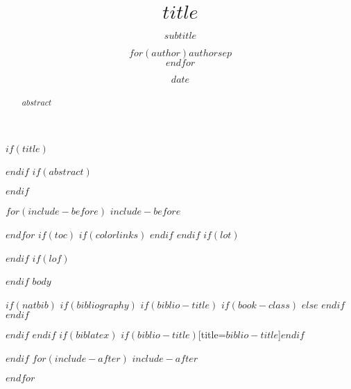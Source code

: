 \documentclass[$if(fontsize)$$fontsize$,$endif$$if(lang)$$babel-lang$,$endif$$if(papersize)$$papersize$paper,$endif$$for(classoption)$$classoption$$sep$,$endfor$]{$documentclass$}
\title{$title$}
\title{}
\subtitle{$subtitle$}
\author{$for(author)$$author$$sep$ \\ $endfor$}
\author{}
\date{$date$}
\date{}
\begin{document}


$if(title)$
\maketitle
$endif$
$if(abstract)$
\begin{abstract}
$abstract$
\end{abstract}
$endif$

$for(include-before)$
$include-before$

$endfor$
$if(toc)$
{
$if(colorlinks)$
\hypersetup{linkcolor=$if(toccolor)$$toccolor$$else$black$endif$}
$endif$
\setcounter{tocdepth}{$toc-depth$}
\tableofcontents
}
$endif$
$if(lot)$
\listoftables
$endif$
$if(lof)$
\listoffigures
$endif$
$body$

$if(natbib)$
$if(bibliography)$
$if(biblio-title)$
$if(book-class)$
\renewcommand\bibname{$biblio-title$}
$else$
\renewcommand\refname{$biblio-title$}
$endif$
$endif$


$endif$
$endif$
$if(biblatex)$
\printbibliography$if(biblio-title)$[title=$biblio-title$]$endif$

$endif$
$for(include-after)$
$include-after$

$endfor$
\end{document}
